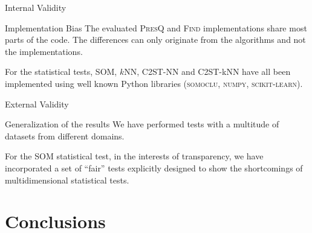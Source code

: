 \documentclass[10pt]{beamer}
\newcommand{\PresQ}[0]{\textsc{PresQ}\xspace}
\begin{document}
\begin{frame}{Internal Validity}
    \begin{alertblock}{Implementation Bias}
        \smallskip
        The evaluated \PresQ and \textsc{Find} implementations share most parts of the code. The differences can only originate
        from the algorithms and not the implementations.
        
        \smallskip
        
        For the statistical tests, SOM, $k$NN, C2ST-NN and C2ST-kNN have all been implemented using well known
        Python libraries (\textsc{somoclu}, \textsc{numpy}, \textsc{scikit-learn}).
    \end{alertblock}
\end{frame}

\begin{frame}{External Validity}
    \begin{alertblock}{Generalization of the results}
        \smallskip
        We have performed tests with a multitude of datasets from different domains.
        
        \smallskip

        For the SOM statistical test, in the interests of transparency, we have incorporated a set
        of ``fair'' tests explicitly designed to show the shortcomings of multidimensional statistical tests.
        
    \end{alertblock}
\end{frame}

\section{Conclusions}
\end{document}
